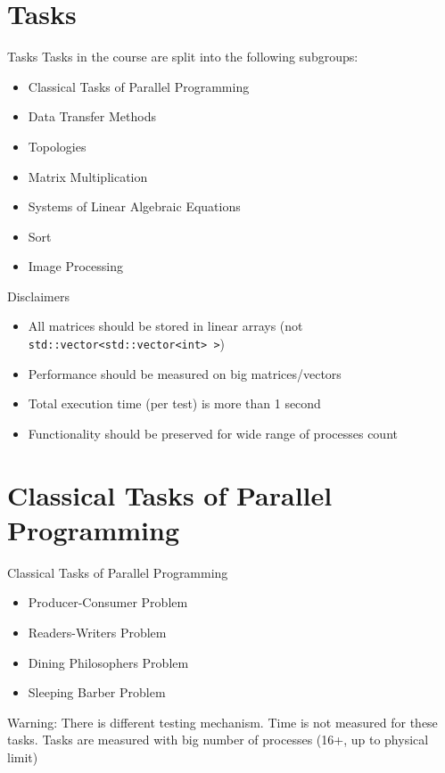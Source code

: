 \documentclass{beamer}
\begin{document}
\section{Tasks}

\begin{frame}{Tasks}
  Tasks in the course are split into the following subgroups:
  \begin{itemize}
    \item Classical Tasks of Parallel Programming
    \item Data Transfer Methods
    \item Topologies
    \item Matrix Multiplication
    \item Systems of Linear Algebraic Equations
    \item Sort
    \item Image Processing
  \end{itemize}
\end{frame}

\begin{frame}{Disclaimers}
  \begin{itemize}
    \item All matrices should be stored in linear arrays (not \texttt{std::vector<std::vector<int> >})
    \item Performance should be measured on big matrices/vectors
    \item Total execution time (per test) is more than 1 second
    \item Functionality should be preserved for wide range of processes count
  \end{itemize}
\end{frame}

\section{Classical Tasks of Parallel Programming}

\begin{frame}{Classical Tasks of Parallel Programming}
  \begin{itemize}
    \item Producer-Consumer Problem
    \item Readers-Writers Problem
    \item Dining Philosophers Problem
    \item Sleeping Barber Problem
  \end{itemize}
  Warning:
  There is different testing mechanism. Time is not measured for these tasks.
  Tasks are measured with big number of processes (16+, up to physical limit)
\end{frame}
\end{document}
